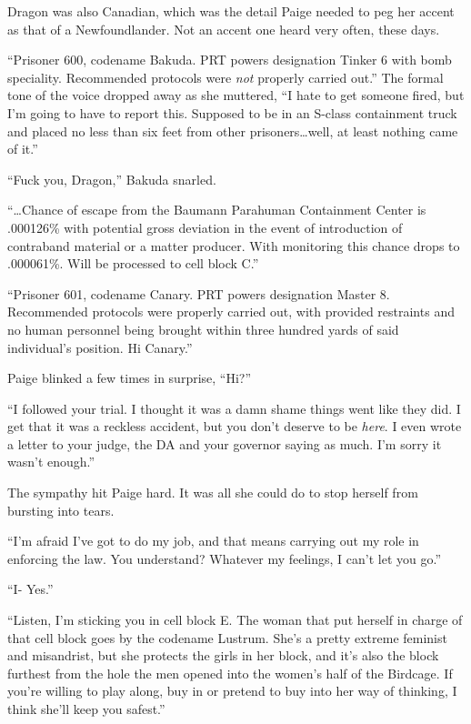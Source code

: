 Dragon was also Canadian, which was the detail Paige needed to peg her accent as that of a Newfoundlander.  Not an accent one heard very often, these days.



``Prisoner 600, codename Bakuda.  PRT powers designation Tinker 6 with bomb speciality.  Recommended protocols were \emph{not} properly carried out.''  The formal tone of the voice dropped away as she muttered, ``I hate to get someone fired, but I'm going to have to report this.  Supposed to be in an S-class containment truck and placed no less than six feet from other prisoners\ldots well, at least nothing came of it.''



``Fuck you, Dragon,'' Bakuda snarled.



``\ldots{}Chance of escape from the Baumann Parahuman Containment Center is .000126\% with potential gross deviation in the event of introduction of contraband material or a matter producer.  With monitoring this chance drops to .000061\%.  Will be processed to cell block C.''



``Prisoner 601, codename Canary.  PRT powers designation Master 8.  Recommended protocols were properly carried out, with provided restraints and no human personnel being brought within three hundred yards of said individual's position.  Hi Canary.''



Paige blinked a few times in surprise, ``Hi?''



``I followed your trial.  I thought it was a damn shame things went like they did.  I get that it was a reckless accident, but you don't deserve to be \emph{here}.  I even wrote a letter to your judge, the DA and your governor saying as much.  I'm sorry it wasn't enough.''



The sympathy hit Paige hard.  It was all she could do to stop herself from bursting into tears.



``I'm afraid I've got to do my job, and that means carrying out my role in enforcing the law.  You understand?  Whatever my feelings, I can't let you go.''



``I- Yes.''



``Listen, I'm sticking you in cell block E.  The woman that put herself in charge of that cell block goes by the codename Lustrum.  She's a pretty extreme feminist and misandrist, but she protects the girls in her block, and it's also the block furthest from the hole the men opened into the women's half of the Birdcage.  If you're willing to play along, buy in or pretend to buy into her way of thinking, I think she'll keep you safest.''



